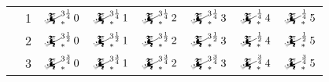 \documentclass{article}
\newcommand{\mainfun}[3]{\mathwitch_{#1}^{#2}#3}
\begin{document}
\begin{table}[H]
\begin{tabular}{c|c|c|c|c|c|c|c|}
			                       &  1                        &    $\mainfun{*}{3\frac14}0$  &    $\mainfun{*}{3\frac14}1$  &    $\mainfun{*}{3\frac14}2$  &    $\mainfun{*}{3\frac14}3$  &    $\mainfun{*}{\frac14}4$  &    $\mainfun{*}{\frac14}5$  \\\cline{2-8}
			                       &  2                        &    $\mainfun{*}{3\frac12}0$  &    $\mainfun{*}{3\frac12}1$  &    $\mainfun{*}{3\frac12}2$  &    $\mainfun{*}{3\frac12}3$  &    $\mainfun{*}{\frac12}4$  &    $\mainfun{*}{\frac12}5$  \\\cline{2-8}
			                       &  3                        &    $\mainfun{*}{3\frac34}0$  &    $\mainfun{*}{3\frac34}1$  &    $\mainfun{*}{3\frac34}2$  &    $\mainfun{*}{3\frac34}3$  &    $\mainfun{*}{\frac34}4$  &    $\mainfun{*}{\frac34}5$  \\\hline
		\end{tabular}
	\end{table}
\end{document}
